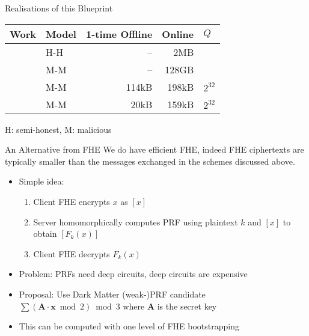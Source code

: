 \documentclass[xcolor=table,10pt,aspectratio=169]{beamer}
\renewcommand{\vec}[1]{\ensuremath{\mathbf{#1}}\xspace}
\providecommand{\mat}[1]{\ensuremath{\vec{#1}}\xspace}
\begin{document}
\begin{frame}[label={sec:orgc251170}]{Realisations of this Blueprint}
\begin{center}
\begin{tabular}{llrrl}
\toprule
Work & Model & 1-time Offline & Online & \(Q\)\\
\midrule
\cite{PKC:ADDS21} & H-H & -- & 2MB & \\
\cite{PKC:ADDS21} & M-M & -- & 128GB & \\
\cite{AC:AlbGur24} & M-M & 114kB & 198kB & \(2^{32}\)\\
\cite{EPRINT:ESTX24} & M-M & 20kB & 159kB & \(2^{32}\)\\
\bottomrule
\end{tabular}

\end{center}

\begin{center}
H: semi-honest, M: malicious
\end{center}
\end{frame}
\begin{frame}[label={sec:orgdeb9b98}]{An Alternative from FHE \cite{EC:ADDG24}}
We do have efficient FHE, indeed FHE ciphertexts are typically \alert{smaller} than the messages exchanged in the schemes discussed above.
\begin{itemize}
\item Simple idea:
\begin{enumerate}
\item Client FHE encrypts \(x\) as \([x]\)
\item Server homomorphically computes PRF using plaintext \(k\) and \([x]\) to obtain \([F_{k}(x)]\)
\item Client FHE decrypts \(F_{k}(x)\)
\end{enumerate}
\item Problem: PRFs need deep circuits, deep circuits are expensive
\item Proposal: Use Dark Matter (weak-)PRF candidate \cite{TCC:BIPSW18} \(\sum \left(\mat{A}\cdot \vec{x} \bmod 2\right) \bmod 3\) where \(\mat{A}\) is the secret key
\item This can be computed with one level of FHE bootstrapping
\end{itemize}
\end{frame}
\end{document}
